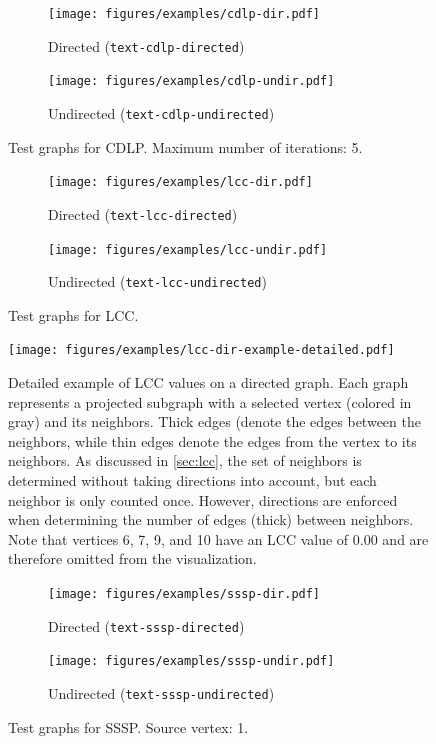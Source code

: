 \begin{figure}[h]
	\centering
	\begin{subfigure}{0.496\textwidth}
		\centering
		\texttt{[image: figures/examples/cdlp-dir.pdf]}
		\caption{Directed (\texttt{text-cdlp-directed})}
	\end{subfigure}
	\begin{subfigure}{0.496\textwidth}
		\centering
		\texttt{[image: figures/examples/cdlp-undir.pdf]}
		\caption{Undirected (\texttt{text-cdlp-undirected})}
	\end{subfigure}
	\caption{Test graphs for CDLP. Maximum number of iterations: 5.}
	\label{fig:cdlp_example}
\end{figure}

\begin{figure}[h]
	\centering
	\begin{subfigure}{0.496\textwidth}
		\centering
		\texttt{[image: figures/examples/lcc-dir.pdf]}
		\caption{Directed (\texttt{text-lcc-directed})}
	\end{subfigure}
	\begin{subfigure}{0.496\textwidth}
		\centering
		\texttt{[image: figures/examples/lcc-undir.pdf]}
		\caption{Undirected (\texttt{text-lcc-undirected})}
	\end{subfigure}
	\caption{Test graphs for LCC.}
	\label{fig:lcc_example}
\end{figure}

\begin{figure}[h]
	\centering
	\texttt{[image: figures/examples/lcc-dir-example-detailed.pdf]}
	\caption{Detailed example of LCC values on a directed graph. Each graph represents a projected subgraph with a selected vertex (colored in gray) and its neighbors.
		Thick edges (denote the edges between the neighbors, while thin edges denote the edges from the vertex to its neighbors.
		As discussed in \autoref{sec:lcc}, the set of neighbors is determined without taking directions into account, but each neighbor is only counted once. However, directions are enforced when determining the number of edges (thick) between neighbors.
		Note that vertices 6, 7, 9, and 10 have an LCC value of 0.00 and are therefore omitted from the visualization.}
	\label{fig:lcc_dir_example_detailed}
\end{figure}

\begin{figure}[h]
	\centering
	\begin{subfigure}{0.496\textwidth}
		\centering
		\texttt{[image: figures/examples/sssp-dir.pdf]}
		\caption{Directed (\texttt{text-sssp-directed})}
	\end{subfigure}
	\begin{subfigure}{0.496\textwidth}
		\centering
		\texttt{[image: figures/examples/sssp-undir.pdf]}
		\caption{Undirected (\texttt{text-sssp-undirected})}
	\end{subfigure}
	\caption{Test graphs for SSSP. Source vertex: 1.}
	\label{fig:sssp_example}
\end{figure}

